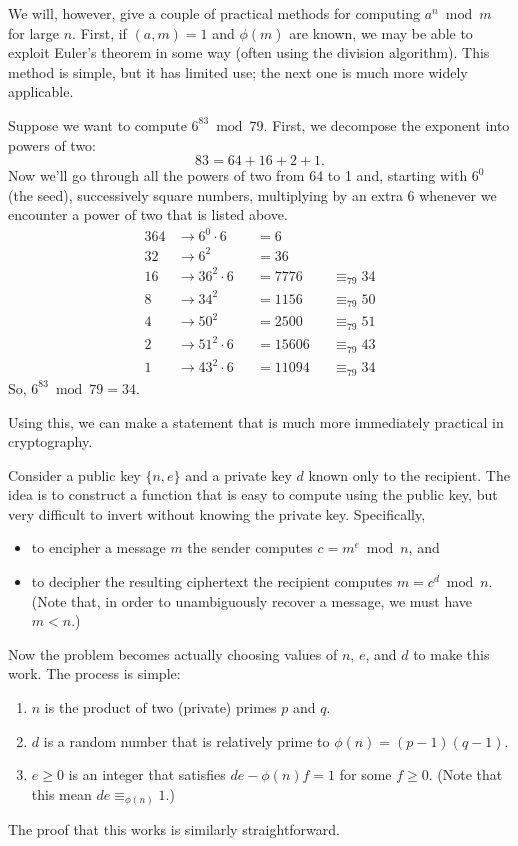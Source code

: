 \documentclass[../m055main.tex]{subfiles}
\begin{document}
We will, however, give a couple of practical methods for computing $a^n \bmod m$ for large $n$.
First, if $(a,m) = 1$ and $\phi (m)$ are known, we may be able to exploit Euler's theorem in some way (often using the division algorithm).
This method is simple, but it has limited use; the next one is much more widely applicable.

\begin{example}
    Suppose we want to compute $6^{83} \bmod 79$.
    First, we decompose the exponent into powers of two:
    \[ 83 = 64 + 16 + 2 + 1. \]
    Now we'll go through all the powers of two from 64 to 1 and, starting with $6^0$ (the seed), successively square numbers, multiplying by an extra 6 whenever we encounter a power of two that is listed above.
    \begin{alignat*}{3}
        \boxed{64} &\rightarrow 6^0 \cdot 6 &&= 6 \\
        32 &\rightarrow 6^2 &&= 36 \\
        \boxed{16} &\rightarrow 36^2 \cdot 6 &&= 7776 &&\equiv_{79} 34 \\
        8 &\rightarrow 34^2 &&= 1156 &&\equiv_{79} 50 \\
        4 &\rightarrow 50^2 &&= 2500 &&\equiv_{79} 51 \\
        \boxed{2} &\rightarrow 51^2 \cdot 6 &&= 15606 &&\equiv_{79} 43 \\
        \boxed{1} &\rightarrow 43^2 \cdot 6 &&= 11094 &&\equiv_{79} 34
    \end{alignat*}
    So, $6^{83} \bmod 79 = 34$.
\end{example}

Using this, we can make a statement that is much more immediately practical in cryptography.

Consider a public key $\{ n, e \}$ and a private key $d$ known only to the recipient.
The idea is to construct a function that is easy to compute using the public key, but very difficult to invert without knowing the private key.
Specifically,
\begin{itemize}
    \item to encipher a message $m$ the sender computes $c = m^e \bmod n$, and
    \item to decipher the resulting ciphertext the recipient computes $m = c^d \bmod n$.
    (Note that, in order to unambiguously recover a message, we must have $m < n$.)
\end{itemize}
Now the problem becomes actually choosing values of $n$, $e$, and $d$ to make this work.
The process is simple:
\begin{enumerate}
    \item $n$ is the product of two (private) primes $p$ and $q$.
    \item $d$ is a random number that is relatively prime to $\phi (n) = (p-1)(q-1)$.
    \item $e \geq 0$ is an integer that satisfies $de - \phi (n) f = 1$ for some $f \geq 0$.
    (Note that this mean $de \equiv_{\phi (n)} 1$.)
\end{enumerate}
The proof that this works is similarly straightforward.
\end{document}
